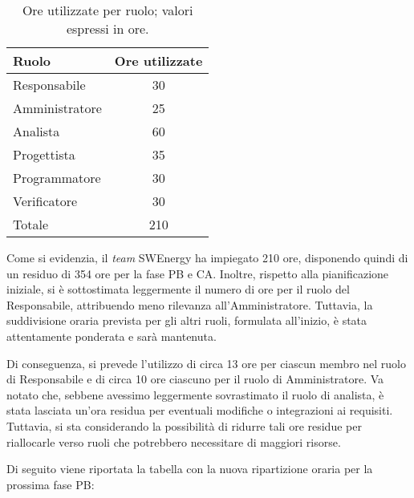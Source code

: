 \begin{table}[H]
	\centering
	\begin{tabular}{l|c}
		\textbf{Ruolo} & \textbf{Ore utilizzate} \\
		\hline
		Responsabile   & 30                      \\
		Amministratore & 25                      \\
		Analista       & 60                      \\
		Progettista    & 35                      \\
		Programmatore  & 30                      \\
		Verificatore   & 30                      \\
		\hline
		Totale         & 210                     \\
	\end{tabular}
	\caption{Ore utilizzate per ruolo; valori espressi in ore.}
\end{table}

Come si evidenzia, il \textit{team} SWEnergy ha impiegato 210 ore, disponendo quindi di un residuo di 354 ore per la fase PB e CA. Inoltre, rispetto alla pianificazione iniziale,
si è sottostimata leggermente il numero di ore per il ruolo del Responsabile, attribuendo meno rilevanza all'Amministratore. Tuttavia, la suddivisione oraria prevista per gli altri ruoli,
formulata all'inizio, è stata attentamente ponderata e sarà mantenuta.

Di conseguenza, si prevede l'utilizzo di circa 13 ore per ciascun membro nel ruolo di Responsabile e di circa 10 ore ciascuno per il ruolo di Amministratore. Va notato che,
sebbene avessimo leggermente sovrastimato il ruolo di analista, è stata lasciata un'ora residua per eventuali modifiche o integrazioni ai requisiti. Tuttavia, si sta considerando
la possibilità di ridurre tali ore residue per riallocarle verso ruoli che potrebbero necessitare di maggiori risorse.

Di seguito viene riportata la tabella con la nuova ripartizione oraria per la prossima fase PB:

